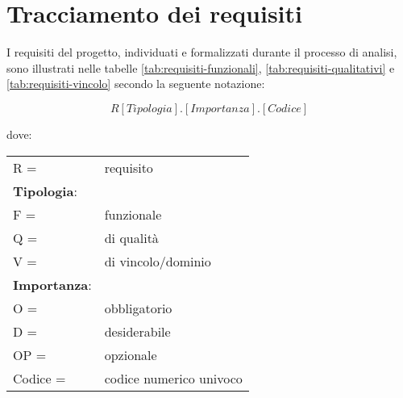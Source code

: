 \section{Tracciamento dei requisiti}
\par I \gls{requisiti} del progetto, individuati e formalizzati durante il processo di analisi, sono illustrati nelle tabelle \ref{tab:requisiti-funzionali}, \ref{tab:requisiti-qualitativi} e \ref{tab:requisiti-vincolo} secondo la seguente notazione:
\par \textbf{\[R[Tipologia].[Importanza].[Codice]\]} 
\par dove:
\par\vspace{20pt}
\begin{tabular}{@{}ll@{}}
    R = & requisito \\
    \textbf{Tipologia}: & \\
    \quad F = & funzionale \\
    \quad Q = & di qualità \\
    \quad V = & di vincolo/dominio \\
    \textbf{Importanza}: & \\
    \quad O = & obbligatorio \\
    \quad D = & desiderabile \\  
    \quad OP = & opzionale \\
    Codice = & codice numerico univoco \\
\end{tabular}
    
\par\vspace{30pt}

